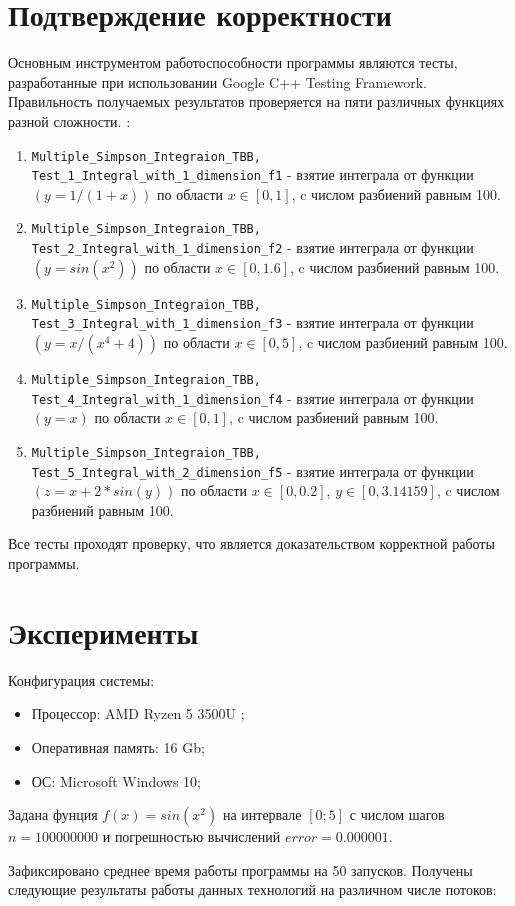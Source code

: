 \documentclass{report}
\begin{document}
\section*{Подтверждение корректности}
Основным инструментом работоспособности программы являются тесты, разработанные при использовании Google C++ Testing Framework. Правильность получаемых результатов проверяется на пяти различных функциях разной сложности.
:
\begin{enumerate} 
\item \verb|Multiple_Simpson_Integraion_TBB, Test_1_Integral_with_1_dimension_f1|	- взятие интеграла от функции $(y=1 / (1 + x))$ по области $x\in[0,1]$, c числом разбиений равным 100.
\item\verb|Multiple_Simpson_Integraion_TBB, Test_2_Integral_with_1_dimension_f2|	- взятие интеграла от функции $(y=sin(x^2))$ по области $x\in[0,1.6]$, c числом разбиений равным 100.
\item\verb|Multiple_Simpson_Integraion_TBB, Test_3_Integral_with_1_dimension_f3|	- взятие интеграла от функции $(y = x / ( x^4 + 4))$ по области $x\in[0,5]$, c числом разбиений равным 100.
\item\verb|Multiple_Simpson_Integraion_TBB, Test_4_Integral_with_1_dimension_f4|	- взятие интеграла от функции $(y=x)$ по области $x\in[0,1]$, c числом разбиений равным 100.
\item\verb|Multiple_Simpson_Integraion_TBB, Test_5_Integral_with_2_dimension_f5|	- взятие интеграла от функции $(z= x+2*sin(y))$ по области $x\in[0,0.2]$, $y\in[0,3.14159]$, c числом разбиений равным 100.
\end{enumerate} 
Все тесты проходят проверку, что является доказательством корректной работы программы.
\newpage

\section*{Эксперименты}
Конфигурация системы:
\begin{itemize}
\item Процессор: AMD Ryzen 5 3500U ;
\item Оперативная память: 16 Gb;
\item ОС: Microsoft Windows 10;
\end{itemize}

\par  Задана фунция $f(x)=sin(x^2)$ на интервале $[0;5]$ с числом шагов $ n=100000000$ и погрешностью вычислений $error = 0.000001$. 
\par Зафиксировано среднее время работы программы на 50 запусков. Получены следующие результаты работы данных технологий на различном числе потоков:
\end{document}
